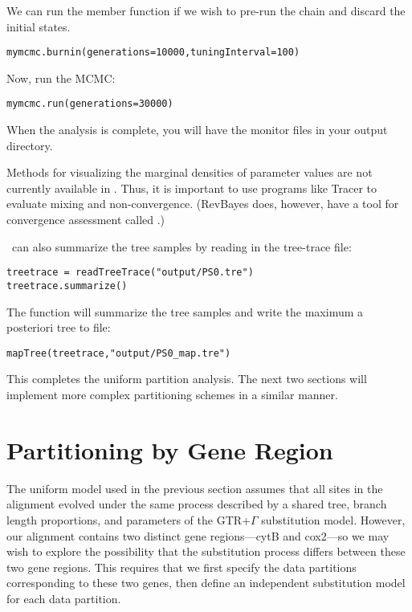 We can run the  member function if we wish to pre-run the chain and discard the initial states. 
{\tt \begin{snugshade*}
\begin{lstlisting}
mymcmc.burnin(generations=10000,tuningInterval=100)
\end{lstlisting}
\end{snugshade*}}


Now, run the MCMC:
{\tt \begin{snugshade*}
\begin{lstlisting}
mymcmc.run(generations=30000)
\end{lstlisting}
\end{snugshade*}}

When the analysis is complete, you will have the monitor files in your output directory.

Methods for visualizing the marginal densities of parameter values are not currently available in \RevBayes. Thus, it is important to use programs like Tracer \citep{Rambaut2011} to evaluate mixing and non-convergence. (RevBayes does, however, have a tool for convergence assessment called .)

\RevBayes~can also summarize the tree samples by reading in the tree-trace file:
{\tt \begin{snugshade*}
\begin{lstlisting}
treetrace = readTreeTrace("output/PS0.tre")
treetrace.summarize()
\end{lstlisting}
\end{snugshade*}}


The  function will summarize the tree samples and write the maximum a posteriori tree to file:
{\tt \begin{snugshade*}
\begin{lstlisting}
mapTree(treetrace,"output/PS0_map.tre")
\end{lstlisting}
\end{snugshade*}}

This completes the uniform partition analysis.
The next two sections will implement more complex partitioning schemes in a similar manner.


\section{Partitioning by Gene Region}\label{secByGene}

The uniform model used in the previous section assumes that all sites in the alignment evolved under the same process described by a shared tree, branch length proportions, and parameters of the GTR+$\Gamma$ substitution model.
However, our alignment contains two distinct gene regions---cytB and cox2---so we may wish to explore the possibility that the substitution process differs between these two gene regions.
This requires that we first specify the data partitions corresponding to these two genes, then define an independent substitution model for each data partition. 

